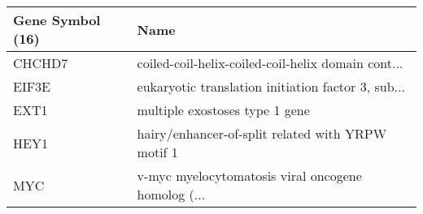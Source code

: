 \begin{tabular}{ll}
\toprule
Gene Symbol (16) &                                               Name \\
\midrule
          CHCHD7 & coiled-coil-helix-coiled-coil-helix domain cont... \\
           EIF3E & eukaryotic translation initiation factor 3, sub... \\
            EXT1 &                     multiple exostoses type 1 gene \\
            HEY1 &  hairy/enhancer-of-split related with YRPW motif 1 \\
             MYC & v-myc myelocytomatosis viral oncogene homolog (... \\
\bottomrule
\end{tabular}

